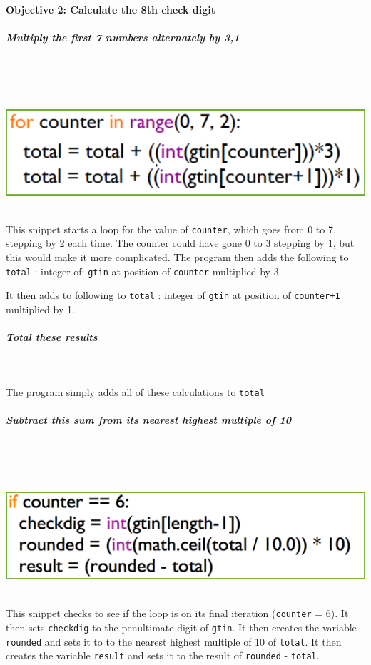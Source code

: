 \documentclass[a4paper]{article}
\begin{document}
\paragraph{Objective 2: Calculate the 8th check digit}
\subparagraph{Multiply the first 7 numbers alternately by 3,1} ~ \par ~ \par
\noindent\includegraphics{task1_multiply1.png} ~\par
This snippet starts a loop for the value of \verb|counter|, which goes from 0 to 7, stepping by 2 each time. The counter could have gone 0 to 3 stepping by 1, but this would make it more complicated. The program then adds the following to \verb|total| : integer of: \verb|gtin| at position of \verb|counter| multiplied by 3. \par
\noindent It then adds to following to \verb|total| : integer of \verb|gtin| at position of \verb|counter+1| multiplied by 1.
\subparagraph{Total these results} ~\par
\noindent The program simply adds all of these calculations to \verb|total|
\subparagraph{Subtract this sum from its nearest highest multiple of 10} ~\par ~\par
\noindent\includegraphics{task1_subtract1.png} ~\par
This snippet checks to see if the loop is on its final iteration (\verb|counter| = 6). It then sets \verb|checkdig| to the penultimate digit of \verb?gtin?. It then creates the variable \verb?rounded? and sets it to to the nearest highest multiple of 10 of \verb?total?. It then creates the variable \verb?result? and sets it to the result of \verb?rounded? - \verb?total?.
\end{document}
